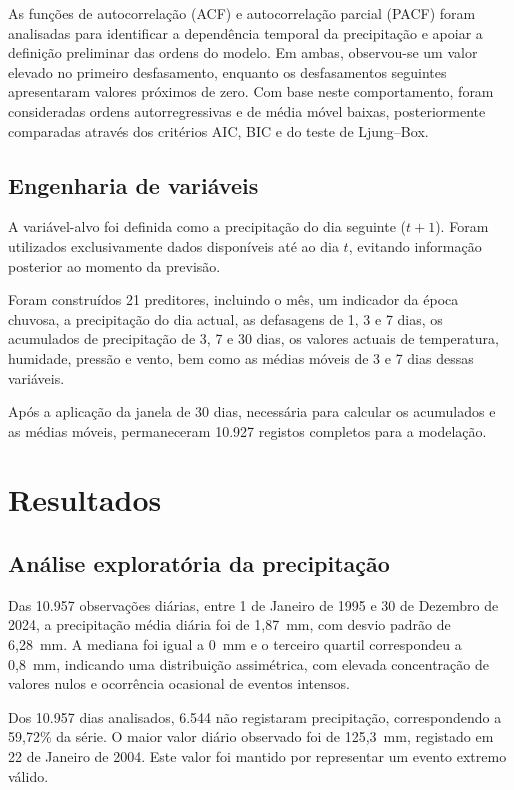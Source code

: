 \documentclass[9pt,twocolumn,twoside,english,portuguese]{opticajnl}
\begin{document}
As funções de autocorrelação (ACF) e autocorrelação parcial (PACF) foram
analisadas para identificar a dependência temporal da precipitação e apoiar a
definição preliminar das ordens do modelo. Em ambas, observou-se um valor
elevado no primeiro desfasamento, enquanto os desfasamentos seguintes
apresentaram valores próximos de zero. Com base neste comportamento, foram
consideradas ordens autorregressivas e de média móvel baixas, posteriormente
comparadas através dos critérios AIC, BIC e do teste de Ljung--Box.

\subsection{Engenharia de variáveis}

A variável-alvo foi definida como a precipitação do dia seguinte ($t+1$).
Foram utilizados exclusivamente dados disponíveis até ao dia $t$, evitando
informação posterior ao momento da previsão.

Foram construídos 21 preditores, incluindo o mês, um indicador da época
chuvosa, a precipitação do dia actual, as defasagens de 1, 3 e 7 dias, os
acumulados de precipitação de 3, 7 e 30 dias, os valores actuais de
temperatura, humidade, pressão e vento, bem como as médias móveis de 3 e 7
dias dessas variáveis.

Após a aplicação da janela de 30 dias, necessária para calcular os acumulados
e as médias móveis, permaneceram 10.927 registos completos para a modelação.

    \section{Resultados}
    
    \subsection{Análise exploratória da precipitação}
    
    Das 10.957 observações diárias, entre 1 de Janeiro de 1995 e 30 de Dezembro de 2024, a precipitação média diária foi de 1,87~mm, com desvio padrão de 6,28~mm. A mediana foi igual a 0~mm e o terceiro quartil correspondeu a 0,8~mm, indicando uma distribuição assimétrica, com elevada concentração de valores nulos e ocorrência ocasional de eventos intensos.
    
    Dos 10.957 dias analisados, 6.544 não registaram precipitação, correspondendo a 59,72\% da série. O maior valor diário observado foi de 125,3~mm, registado em 22 de Janeiro de 2004. Este valor foi mantido por representar um evento extremo válido.
    
\end{document}
